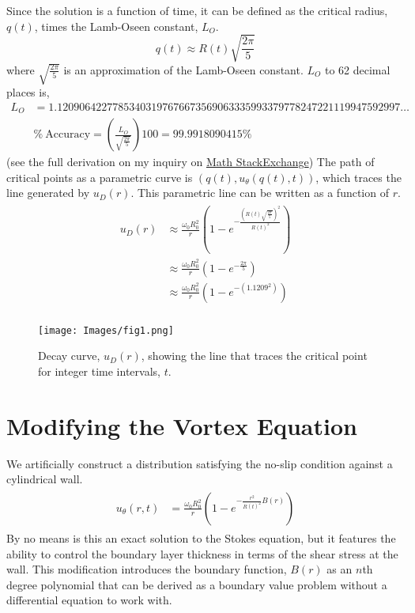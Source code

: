 \documentclass{article}
\begin{document}
Since the solution is a function of time, it can be defined as the critical radius, $q(t)$, times the Lamb-Oseen constant, $L_O$.
$$q(t)\approx R(t)\sqrt{\frac{2\pi}{5}} $$ 
where $\sqrt{\frac{2\pi}{5}}$ is an approximation of the Lamb-Oseen constant. $L_O$ to 62 decimal places is,
\begin{align*}
L_{O}&=1.12090642277853403197676673569063335993379778247221119947592997\dots \\
& \% \: \text{Accuracy} = \left(\frac{L_{O}}{\sqrt{\frac{2\pi}{5}}}\right)100 = 99.9918090415 \%
\end{align*}
(see the full derivation on my inquiry on \href{https://math.stackexchange.com/questions/4932219/how-do-i-find-the-absolute-maximum-and-minimum-values-of-the-lamb-oseen-vortex}{Math StackExchange})
The path of critical points as a parametric curve is $\left(q(t), u_\theta (q(t),t) \right)$, which traces the line generated by $u_D(r)$. This parametric line can be written as a function of $r$.
\begin{align*}
\begin{split}
u_D(r)&\approx \frac{\omega_0 R_0^2}{r}\left(1-e^{-\frac{\left(R(t)\sqrt{\frac{2\pi}{5}}\right)^2}{R(t)^2}}\right)\\
&\approx \frac{\omega_0 R_0^2}{r}\left(1-e^{-\frac{2\pi}{5}}\right) \\
&\approx \frac{\omega_0 R_0^2}{r}\left(1-e^{-\left(1.1209^2\right)}\right) \\
\end{split}
\end{align*}


\begin{figure}[h]
    \centering
    \texttt{[image: Images/fig1.png]}
    \caption{Decay curve, $u_D(r)$, showing the line that traces the critical point for integer time intervals, $t$.}
    \label{fig:enter-label}
\end{figure}

\section{Modifying the Vortex Equation}
We artificially construct a distribution satisfying the no-slip condition against a cylindrical wall. 
\begin{align} \label{Eq2}
    \begin{split}
    u_{\theta} (r,t)
    &= \frac{\omega_0 R_0^2}{r}\left(1-e^{-\frac{r^2}{R(t)^2}B(r)}\right)
    \end{split}
\end{align}
By no means is this an exact solution to the Stokes equation, but it features the ability to control the boundary layer thickness in terms of the shear stress at the wall. This modification introduces the boundary function, $B(r)$ as an $n$th degree polynomial that can be derived as a boundary value problem without a differential equation to work with.
\end{document}
